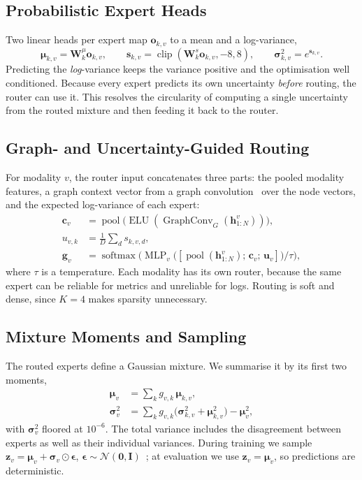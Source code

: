 \documentclass[journal]{IEEEtran}
\begin{document}
\subsection{Probabilistic Expert Heads}
\label{sec:prob}
Two linear heads per expert map $\bm{o}_{k,v}$ to a mean and a log-variance,
\begin{equation}
  \bm{\mu}_{k,v}=\bm{W}^{\mu}_k\bm{o}_{k,v},\qquad
  \bm{s}_{k,v}=\operatorname{clip}\!\left(\bm{W}^{s}_k\bm{o}_{k,v},-8,8\right),\qquad
  \bm{\sigma}^2_{k,v}=e^{\bm{s}_{k,v}} .
\end{equation}
Predicting the \emph{log}-variance keeps the variance positive and the optimisation well conditioned.
Because every expert predicts its own uncertainty \emph{before} routing, the router can use it. This
resolves the circularity of computing a single uncertainty from the routed mixture and then feeding it
back to the router.

\subsection{Graph- and Uncertainty-Guided Routing}
\label{sec:router}
For modality $v$, the router input concatenates three parts: the pooled modality features, a graph
context vector from a graph convolution~\cite{kipf2017gcn} over the node vectors, and the expected
log-variance of each expert:
\begin{align}
  \bm{c}_v &= \operatorname{pool}\!\big(\operatorname{ELU}(\operatorname{GraphConv}_G(\bm{h}^v_{1:N}))\big), \\
  u_{v,k} &= \tfrac{1}{D}\textstyle\sum_{d} s_{k,v,d}, \\
  \bm{g}_v &= \operatorname{softmax}\!\Big(\operatorname{MLP}_v\big([\operatorname{pool}(\bm{h}^v_{1:N});\,\bm{c}_v;\,\bm{u}_v]\big)/\tau\Big),
\end{align}
where $\tau$ is a temperature. Each modality has its own router, because the same expert can be reliable
for metrics and unreliable for logs. Routing is soft and dense, since $K=4$ makes sparsity unnecessary.

\subsection{Mixture Moments and Sampling}
\label{sec:moments}
The routed experts define a Gaussian mixture. We summarise it by its first two moments,
\begin{align}
  \bm{\mu}_v &= \textstyle\sum_k g_{v,k}\,\bm{\mu}_{k,v}, \\
  \bm{\sigma}^2_v &= \textstyle\sum_k g_{v,k}\big(\bm{\sigma}^2_{k,v}+\bm{\mu}_{k,v}^{2}\big)-\bm{\mu}_v^{2},
\end{align}
with $\bm{\sigma}^2_v$ floored at $10^{-6}$. The total variance includes the disagreement between experts
as well as their individual variances. During training we sample
$\bm{z}_v=\bm{\mu}_v+\bm{\sigma}_v\odot\bm{\epsilon}$, $\bm{\epsilon}\sim\mathcal{N}(\bm{0},\bm{I})$~\cite{kingma2014vae};
at evaluation we use $\bm{z}_v=\bm{\mu}_v$, so predictions are deterministic.
\end{document}
